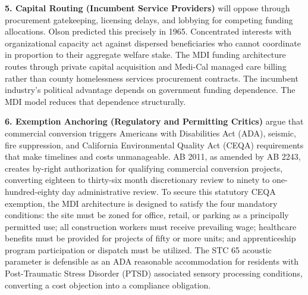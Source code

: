 \documentclass[12pt, letterpaper]{article}
\begin{document}
\textbf{5. Capital Routing (Incumbent Service Providers)} will oppose through procurement gatekeeping, licensing delays, and lobbying for competing funding allocations. Olson predicted this precisely in 1965. Concentrated interests with organizational capacity act against dispersed beneficiaries who cannot coordinate in proportion to their aggregate welfare stake. The MDI funding architecture routes through private capital acquisition and Medi-Cal managed care billing rather than county homelessness services procurement contracts. The incumbent industry's political advantage depends on government funding dependence. The MDI model reduces that dependence structurally.

\textbf{6. Exemption Anchoring (Regulatory and Permitting Critics)} argue that commercial conversion triggers Americans with Disabilities Act (ADA), seismic, fire suppression, and California Environmental Quality Act (CEQA) requirements that make timelines and costs unmanageable. AB 2011, as amended by AB 2243, creates by-right authorization for qualifying commercial conversion projects, converting eighteen to thirty-six month discretionary review to ninety to one-hundred-eighty day administrative review. To secure this statutory CEQA exemption, the MDI architecture is designed to satisfy the four mandatory conditions: the site must be zoned for office, retail, or parking as a principally permitted use; all construction workers must receive prevailing wage; healthcare benefits must be provided for projects of fifty or more units; and apprenticeship program participation or dispatch must be utilized. The STC 65 acoustic parameter is defensible as an ADA reasonable accommodation for residents with Post-Traumatic Stress Disorder (PTSD) associated sensory processing conditions, converting a cost objection into a compliance obligation.
\end{document}
